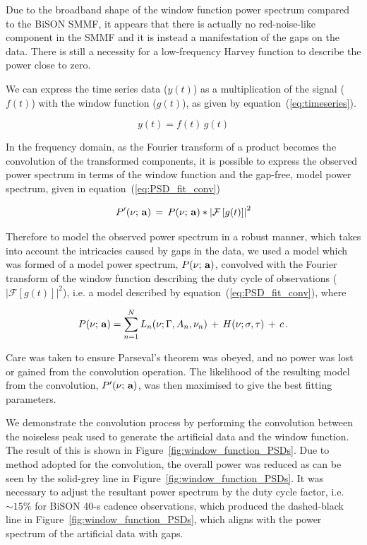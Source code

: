 Due to the broadband shape of the window function power spectrum compared to the BiSON SMMF, it appears that there is actually no red-noise-like component in the SMMF and it is instead a manifestation of the gaps on the data. There is still a necessity for a low-frequency Harvey function to describe the power close to zero.

We can express the  time series data ($y(t)$) as a multiplication of the signal ($f(t)$) with the window function ($g(t)$), as given by equation~(\ref{eq:timeseries}).

\begin{equation}
y(t)  = f(t) \, g(t)
\label{eq:timeseries}
\end{equation}

In the frequency domain, as the Fourier transform of a product becomes the convolution of the transformed components, it is possible to express the observed power spectrum in terms of the window function and the gap-free, model power spectrum, given in equation~(\ref{eq:PSD_fit_conv})

\begin{equation}
P'(\nu; \,{\bf a}) \, = \, P(\nu; \,{\bf a}) * \left|\mathcal{F}\left[g(t)\right]\right|^2
\label{eq:PSD_fit_conv}
\end{equation}

Therefore to model the observed power spectrum in a robust manner, which takes into account the intricacies caused by gaps in the data, we used a model which was formed of a model power spectrum, $P(\nu; \,{\bf a})$, convolved with the Fourier transform of the window function describing the duty cycle of observations ($\left|\mathcal{F}\left[g(t)\right]\right|^2$), i.e. a model described by equation~(\ref{eq:PSD_fit_conv}), where


\begin{equation}
P(\nu; \,{\bf a}) = \sum_{n=1}^{N} L_n(\nu; \Gamma, A_n, \nu_n) \, + \, H(\nu; \sigma, \tau) \, + \, c \, .
\label{eq:PSD_model}
\end{equation}

Care was taken to ensure Parseval's theorem was obeyed, and no power was lost or gained from the convolution operation. The likelihood of the resulting model from the convolution, $P'(\nu; \,{\bf a})$, was then maximised to give the best fitting parameters.

We demonstrate the convolution process by performing the convolution between the noiseless peak used to generate the artificial data and the window function. The result of this is shown in Figure~\ref{fig:window_function_PSDs}. Due to method adopted for the convolution, the overall power was reduced as can be seen by the solid-grey line in Figure~\ref{fig:window_function_PSDs}. It was necessary to adjust the resultant power spectrum by the duty cycle factor, i.e. $\sim 15\%$ for BiSON 40-s cadence observations, which produced the dashed-black line in Figure~\ref{fig:window_function_PSDs}, which aligns with the power spectrum of the artificial data with gaps.

